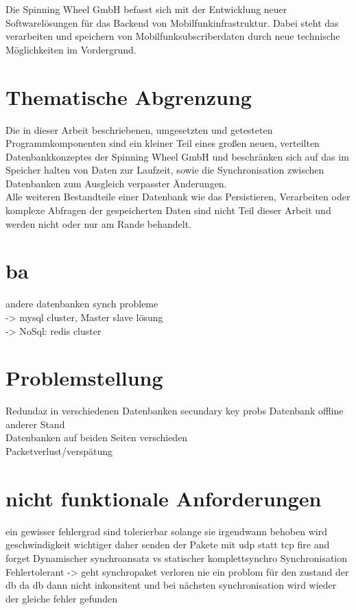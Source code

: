 \documentclass[a4paper,11pt,oneside,%
headsepline,												%
footsepline,												%
bibtotocnumbered									%
]{scrreprt}
\begin{document}
Die Spinning Wheel GmbH befasst sich mit der Entwicklung neuer Softwarelösungen für das Backend von Mobilfunkinfrastruktur. Dabei steht das verarbeiten und speichern von Mobilfunksubscriberdaten durch neue technische Möglichkeiten im Vordergrund.

\section{Thematische Abgrenzung}
Die in dieser Arbeit beschriebenen, umgesetzten und getesteten Programmkomponenten sind ein kleiner Teil eines großen neuen, verteilten Datenbankkonzeptes der Spinning Wheel GmbH und beschränken sich auf das im Speicher halten von Daten zur Laufzeit, sowie die Synchronisation zwischen Datenbanken zum Ausgleich verpasster Änderungen.\\

Alle weiteren Bestandteile einer Datenbank wie das Persistieren, Verarbeiten oder komplexe Abfragen der gespeicherten Daten sind nicht Teil dieser Arbeit und werden nicht oder nur am Rande behandelt.  

\section{ba}
andere datenbanken synch probleme\\
-> mysql cluster, Master slave lösung\\
-> NoSql: redis cluster\\



\section{Problemstellung}
Redundaz in verschiedenen Datenbanken
secundary key probs
Datenbank offline anderer Stand \\
Datenbanken auf beiden Seiten verschieden\\
Packetverlust/verspätung



\section{nicht funktionale Anforderungen}
ein gewisser fehlergrad sind tolerierbar solange sie irgendwann behoben wird
geschwindigkeit wichtiger daher senden der Pakete mit udp statt tcp fire and forget
Dynamischer synchroansatz vs statischer komplettsynchro
Synchronisation Fehlertolerant -> geht synchropaket verloren nie ein problom für den zustand der db da db dann nicht inkonsitent und bei nächsten synchronisation wird wieder der gleiche fehler gefunden  
\end{document}

